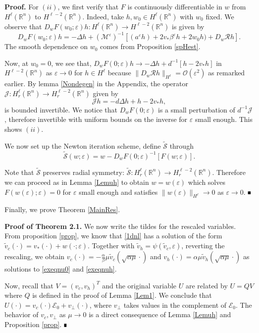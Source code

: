 \documentclass[letterpaper,11pt]{article}
\newcommand{\R}{\mathbb{R}}
\newcommand{\rmO}{\mathcal{O}}
\newcommand{\eps}{\varepsilon}
\newcommand{\Rm}{\mathcal{R}}
\newcommand{\M}{\mathcal{M}}
\newcommand{\cS}{\mathcal{S}}
\newcommand{\cJ}{\mathcal{J}}
\numberwithin{equation}{section}
\theoremstyle{plain}
\theoremstyle{remark}
\newenvironment{Proof}[1][.]%
 {\begin{trivlist}\item[]\textbf{Proof#1 }}%
 {\hspace*{\fill}$\rule{0.3\baselineskip}{0.35\baselineskip}$\end{trivlist}}
\begin{document}
\begin{Proof}
For $(ii)$, we first verify that $F$ is continuously differentiable in $w$ from $H^\ell (\R^n)$ to $H^{\ell-2}(\R^n)$. Indeed, take $h, w_0\in H^\ell(\R^n)$ with $w_0$ fixed. We observe that $D_wF(w_0;\eps)h:H^\ell (\R^n) \to H^{\ell-2}(\R^n)$ is given by
\[
D_wF(w_0;\eps)h = -\Delta h+(\M^\eps)^{-1}\left[(a^\eps h)+2v_*\beta^\eps h + 2w_0h)+D_w\Rm h\right].
\]
The smooth dependence on $w_0$ comes from Proposition \ref{spHest}.

Now, at $w_0 = 0$, we see that, $D_wF(0;\eps)h \to -\Delta h+d^{-1}[h-2v_*h]$ in $H^{\ell-2}(\R^n)$ as $\eps \to 0$ for $h \in H^\ell$ because $\|D_w\Rm h\|_{H^\ell} = \rmO(\eps^2)$ as remarked earlier. By lemma \ref{Nondegen} in the Appendix, the operator $\cJ : H^\ell_r(\R^n) \to H^{\ell-2}_r(\R^n)$ given by 
\[
\cJ h = -d \Delta h+h-2v_*h,
\] is bounded invertible. We notice that $D_wF(0;\eps)$ is a small perturbation of $d^{-1}\cJ$, therefore invertible with uniform bounds on the inverse for $\eps$ small enough. This shows $(ii)$.

We now set up the Newton iteration scheme, define $\tilde{\cS}$ through
\[\tilde{\cS}(w;\eps) = w-D_wF(0;\eps)^{-1}[F(w;\eps)].\]

Note that $\tilde{\cS}$ preserves radial symmetry: $\tilde{\cS} : H^\ell_r(\R^n) \to H^{\ell-2}_r(\R^n)$. Therefore we can proceed as in Lemma \ref{Lemuh} to obtain $w=w(\eps)$ which solves $F(w(\eps);\eps) = 0$ for $\eps $ small enough and satisfies $\|w(\eps)\|_{H^\ell} \to 0$ as $\eps \to 0$.
\end{Proof}

Finally, we prove Theorem \ref{MainRes}.
\begin{Proof}[ of Theorem 2.1.] We now write the tildes for the rescaled variables. From proposition \ref{prop}, we know that \eqref{1dnl} has a solution of the form $\tilde{v}_c(\cdot) = v_*(\cdot)+w(\cdot;\eps)$. Together with $\tilde{v}_h = \psi(\tilde{v}_c,\eps)$, reverting the rescaling, we obtain $v_c(\cdot) = -\frac{\alpha}{\beta}\mu \tilde{v}_c(\sqrt{\alpha\mu }\cdot)$ and $v_h(\cdot) = \alpha\mu \tilde{v}_h(\sqrt{\alpha\mu}\cdot)$ as solutions to \eqref{exeqnu0} and \eqref{exeqnuh}.

 Now, recall that $V=(v_c,v_h)^T$ and the original variable $U$ are related by $U= QV$ where $Q$ is defined in the proof of Lemma \ref{Lem1}. We conclude that $U(\cdot)=v_c(\cdot)\mathcal{E}_0+v_{\perp}(\cdot)$, where $v_{\perp}$ takes values in the complement of $\mathcal{E}_0$. The behavior of $v_c,v_{\perp}$ as $\mu \to 0$ is a direct consequence of Lemma \ref{Lemuh} and Proposition \ref{prop}.
\end{Proof}
\end{document}
